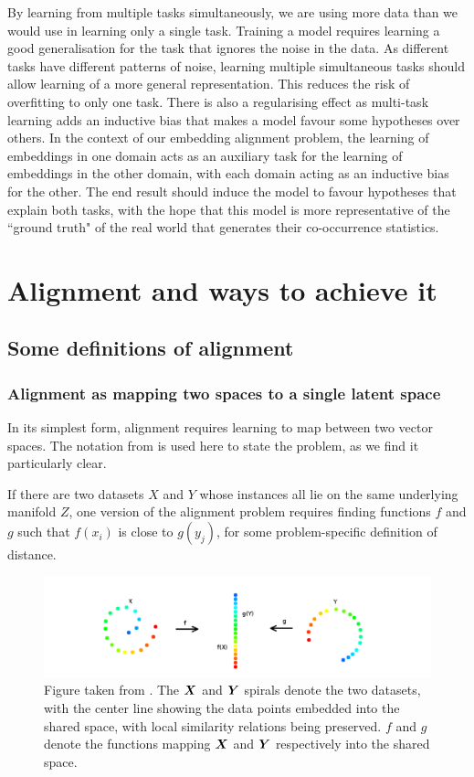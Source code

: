 By learning from multiple tasks simultaneously, we are using more data than we would use in learning only a single task. Training a model requires learning a good generalisation for the task that ignores the noise in the data. As different tasks have different patterns of noise, learning multiple simultaneous tasks should allow learning of a more general representation. This reduces the risk of overfitting to only one task. There is also a regularising effect as multi-task learning adds an inductive bias that makes a model favour some hypotheses over others. In the context of our embedding alignment problem, the learning of embeddings in one domain acts as an auxiliary task for the learning of embeddings in the other domain, with each domain acting as an inductive bias for the other. The end result should induce the model to favour hypotheses that explain both tasks, with the hope that this model is more representative of the ``ground truth" of the real world that generates their co-occurrence statistics.  

\section{Alignment and ways to achieve it}
    
\subsection{Some definitions of alignment}

\subsubsection{Alignment as mapping two spaces to a single latent space}
In its simplest form, alignment requires learning to map between two vector spaces. The notation from \cite{ManifoldLearningTheoryAndApplications} is used here to state the problem, as we find it particularly clear.

If there are two datasets $X$ and $Y$ whose instances all lie on the same underlying manifold $Z$, one version of the alignment problem requires finding functions $f$ and $g$ such that $f(x_i)$ is close  to $g(y_j)$, for some problem-specific definition of distance.

\begin{figure}[H]
    \centering
    \includegraphics[width=\textwidth]{images/review/alignment.png}
    \caption{
        Figure taken from \cite{ManifoldLearningTheoryAndApplications}. The $\boldsymbol{X}$ and $\boldsymbol{Y}$ spirals denote the two datasets, with the center line showing the data points embedded into the shared space, with local similarity relations being preserved. $f$ and $g$ denote the functions mapping $\boldsymbol{X}$ and $\boldsymbol{Y}$ respectively into the shared space. 
    }
\end{figure}

